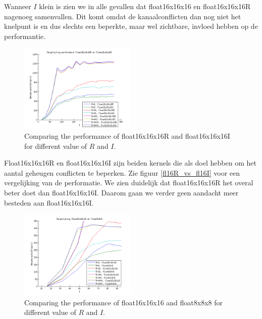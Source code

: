 \documentclass[11pt]{IEEEtran}
\begin{document}
Wanneer $I$ klein is zien we in alle gevallen dat float16x16x16 en float16x16x16R nagenoeg samenvallen. Dit komt omdat de kanaalconflicten dan nog niet het knelpunt is en dus slechts een beperkte, maar wel zichtbare, invloed hebben op de performantie.



\begin{figure}[h!]
\centering
\includegraphics[width=0.5\textwidth]{fl16R_vs_fl16I}
\caption{Comparing the performance of float16x16x16R and float16x16x16I for different value of $R$ and $I$.}
\end{figure}

Float16x16x16R en float16x16x16I zijn beiden kernels die als doel hebben om het aantal geheugen conflicten te beperken. Zie figuur \ref{fl16R_vs_fl16I} voor een vergelijking van de performatie. We zien duidelijk dat float16x16x16R het overal beter doet dan float16x16x16I. Daarom gaan we verder geen aandacht meer besteden aan float16x16x16I.


\begin{figure}[h!]
\centering
\includegraphics[width=0.5\textwidth]{fl16_vs_fl8_klein}
\caption{\label{fl16_vs_fl8_klein} Comparing the performance of float16x16x16 and float8x8x8 for different value of $R$ and $I$.}
\end{figure}
\end{document}
